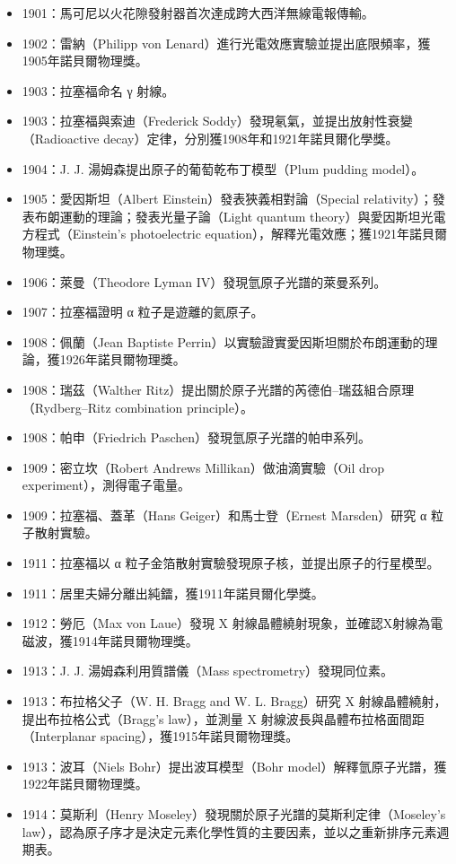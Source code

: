 \documentclass[a4paper,12pt]{article}
\begin{document}
\begin{itemize}
\item 1901：馬可尼以火花隙發射器首次達成跨大西洋無線電報傳輸。
\item 1902：雷納（Philipp von Lenard）進行光電效應實驗並提出底限頻率，獲1905年諾貝爾物理獎。
\item 1903：拉塞福命名 γ 射線。
\item 1903：拉塞福與索迪（Frederick Soddy）發現氡氣，並提出放射性衰變（Radioactive decay）定律，分別獲1908年和1921年諾貝爾化學獎。
\item 1904：J. J. 湯姆森提出原子的葡萄乾布丁模型（Plum pudding model）。
\item 1905：愛因斯坦（Albert Einstein）發表狹義相對論（Special relativity）；發表布朗運動的理論；發表光量子論（Light quantum theory）與愛因斯坦光電方程式（Einstein's photoelectric equation），解釋光電效應；獲1921年諾貝爾物理獎。
\item 1906：萊曼（Theodore Lyman IV）發現氫原子光譜的萊曼系列。
\item 1907：拉塞福證明 α 粒子是遊離的氦原子。
\item 1908：佩蘭（Jean Baptiste Perrin）以實驗證實愛因斯坦關於布朗運動的理論，獲1926年諾貝爾物理獎。
\item 1908：瑞茲（Walther Ritz）提出關於原子光譜的芮德伯–瑞茲組合原理（Rydberg–Ritz combination principle）。
\item 1908：帕申（Friedrich Paschen）發現氫原子光譜的帕申系列。
\item 1909：密立坎（Robert Andrews Millikan）做油滴實驗（Oil drop experiment），測得電子電量。
\item 1909：拉塞福、蓋革（Hans Geiger）和馬士登（Ernest Marsden）研究 α 粒子散射實驗。
\item 1911：拉塞福以 α 粒子金箔散射實驗發現原子核，並提出原子的行星模型。
\item 1911：居里夫婦分離出純鐳，獲1911年諾貝爾化學獎。
\item 1912：勞厄（Max von Laue）發現 X 射線晶體繞射現象，並確認X射線為電磁波，獲1914年諾貝爾物理獎。
\item 1913：J. J. 湯姆森利用質譜儀（Mass spectrometry）發現同位素。
\item 1913：布拉格父子（W. H. Bragg and W. L. Bragg）研究 X 射線晶體繞射，提出布拉格公式（Bragg's law），並測量 X 射線波長與晶體布拉格面間距（Interplanar spacing），獲1915年諾貝爾物理獎。
\item 1913：波耳（Niels Bohr）提出波耳模型（Bohr model）解釋氫原子光譜，獲1922年諾貝爾物理獎。
\item 1914：莫斯利（Henry Moseley）發現關於原子光譜的莫斯利定律（Moseley's law），認為原子序才是決定元素化學性質的主要因素，並以之重新排序元素週期表。

\end{itemize}
\end{document}
